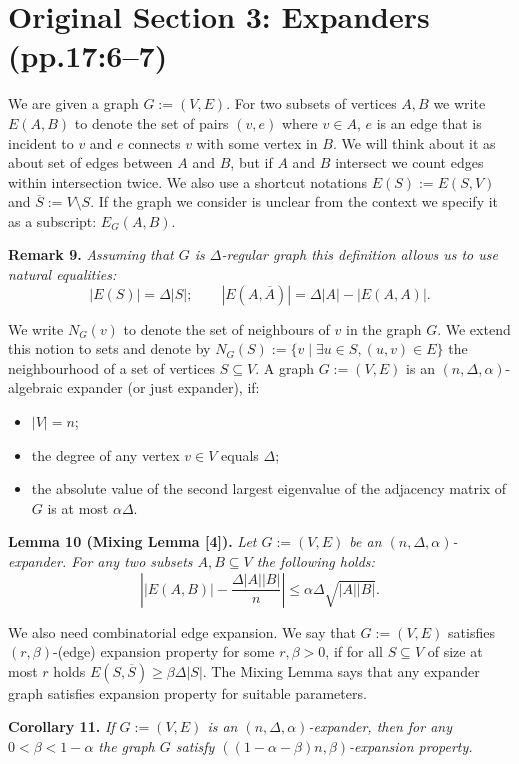\documentclass[10pt,a4paper]{article}
\newenvironment{result}[1]{\par\medskip\noindent\textbf{#1.}\itshape}{\par\medskip}
\begin{document}
\section*{Original Section 3: Expanders (pp.17:6--7)}
We are given a graph $G:=(V,E)$. For two subsets of vertices $A,B$ we write $E(A,B)$ to denote the set of pairs $(v,e)$ where $v\in A$, $e$ is an edge that is incident to $v$ and $e$ connects $v$ with some vertex in $B$. We will think about it as about set of edges between $A$ and $B$, but if $A$ and $B$ intersect we count edges within intersection twice. We also use a shortcut notations $E(S):=E(S,V)$ and $\overline S:=V\setminus S$. If the graph we consider is unclear from the context we specify it as a subscript: $E_G(A,B)$.
\begin{result}{Remark 9}
Assuming that $G$ is $\Delta$-regular graph this definition allows us to use natural equalities:
\[|E(S)|=\Delta|S|;\qquad |E(A,\overline A)|=\Delta|A|-|E(A,A)|.\]
\end{result}
We write $N_G(v)$ to denote the set of neighbours of $v$ in the graph $G$. We extend this notion to sets and denote by $N_G(S):=\{v\mid\exists u\in S,(u,v)\in E\}$ the neighbourhood of a set of vertices $S\subseteq V$.
A graph $G:=(V,E)$ is an $(n,\Delta,\alpha)$-algebraic expander (or just expander), if:
\begin{itemize}\item $|V|=n$;
\item the degree of any vertex $v\in V$ equals $\Delta$;
\item the absolute value of the second largest eigenvalue of the adjacency matrix of $G$ is at most $\alpha\Delta$.\end{itemize}
\begin{result}{Lemma 10 (Mixing Lemma [4])}
Let $G:=(V,E)$ be an $(n,\Delta,\alpha)$-expander. For any two subsets $A,B\subseteq V$ the following holds:
\[\left||E(A,B)|-\frac{\Delta|A||B|}{n}\right|\le\alpha\Delta\sqrt{|A||B|}.\]
\end{result}
We also need combinatorial edge expansion. We say that $G:=(V,E)$ satisfies $(r,\beta)$-(edge) expansion property for some $r,\beta>0$, if for all $S\subseteq V$ of size at most $r$ holds $E(S,\overline S)\ge\beta\Delta|S|$. The Mixing Lemma says that any expander graph satisfies expansion property for suitable parameters.
\begin{result}{Corollary 11}
If $G:=(V,E)$ is an $(n,\Delta,\alpha)$-expander, then for any $0<\beta<1-\alpha$ the graph $G$ satisfy $((1-\alpha-\beta)n,\beta)$-expansion property.
\end{result}
\end{document}
